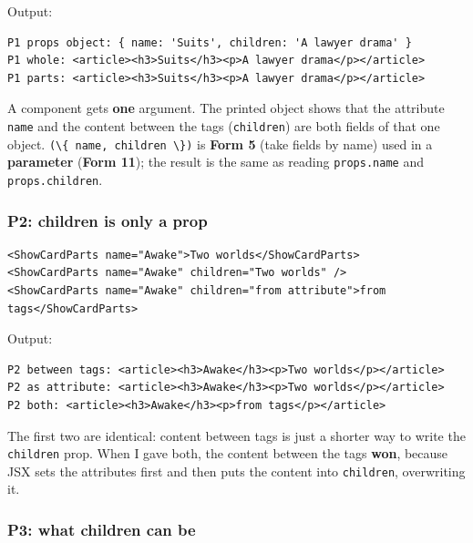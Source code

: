 \documentclass[
  10pt,
]{article}
\newcommand{\passthrough}[1]{#1}
\begin{document}
Output:

\begin{lstlisting}
P1 props object: { name: 'Suits', children: 'A lawyer drama' }
P1 whole: <article><h3>Suits</h3><p>A lawyer drama</p></article>
P1 parts: <article><h3>Suits</h3><p>A lawyer drama</p></article>
\end{lstlisting}

A component gets \textbf{one} argument. The printed object shows that
the attribute \passthrough{\lstinline!name!} and the content between the
tags (\passthrough{\lstinline!children!}) are both fields of that one
object. \passthrough{\lstinline!(\{ name, children \})!} is \textbf{Form
5} (take fields by name) used in a \textbf{parameter} (\textbf{Form
11}); the result is the same as reading
\passthrough{\lstinline!props.name!} and
\passthrough{\lstinline!props.children!}.

\hypertarget{p2-children-is-only-a-prop}{%
\subsubsection{P2: children is only a
prop}\label{p2-children-is-only-a-prop}}

\begin{lstlisting}
<ShowCardParts name="Awake">Two worlds</ShowCardParts>
<ShowCardParts name="Awake" children="Two worlds" />
<ShowCardParts name="Awake" children="from attribute">from tags</ShowCardParts>
\end{lstlisting}

Output:

\begin{lstlisting}
P2 between tags: <article><h3>Awake</h3><p>Two worlds</p></article>
P2 as attribute: <article><h3>Awake</h3><p>Two worlds</p></article>
P2 both: <article><h3>Awake</h3><p>from tags</p></article>
\end{lstlisting}

The first two are identical: content between tags is just a shorter way
to write the \passthrough{\lstinline!children!} prop. When I gave both,
the content between the tags \textbf{won}, because JSX sets the
attributes first and then puts the content into
\passthrough{\lstinline!children!}, overwriting it.

\hypertarget{p3-what-children-can-be}{%
\subsubsection{P3: what children can be}\label{p3-what-children-can-be}}
\end{document}
